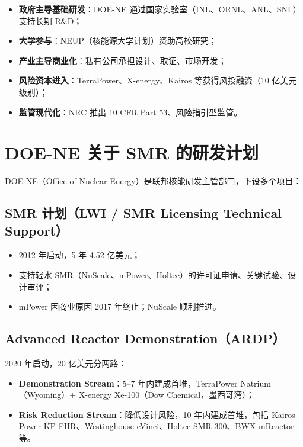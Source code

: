 \documentclass[
  UTF8,
  scheme=plain,
  fontsize=10pt,
  openany
]{ctexbook}
\begin{document}
\begin{itemize}
\tightlist
\item
  \textbf{政府主导基础研发}：DOE-NE
  通过国家实验室（INL、ORNL、ANL、SNL）支持长期 R\&D；
\item
  \textbf{大学参与}：NEUP（核能源大学计划）资助高校研究；
\item
  \textbf{产业主导商业化}：私有公司承担设计、取证、市场开发；
\item
  \textbf{风险资本进入}：TerraPower、X-energy、Kairos 等获得风投融资（10
  亿美元级别）；
\item
  \textbf{监管现代化}：NRC 推出 10 CFR Part 53、风险指引型监管。
\end{itemize}

\section{DOE-NE 关于 SMR
的研发计划}\label{doe-ne-ux5173ux4e8e-smr-ux7684ux7814ux53d1ux8ba1ux5212}

DOE-NE（Office of Nuclear Energy）是联邦核能研发主管部门，下设多个项目：

\subsection{SMR 计划（LWI / SMR Licensing Technical
Support）}\label{smr-ux8ba1ux5212lwi-smr-licensing-technical-support}

\begin{itemize}
\tightlist
\item
  2012 年启动，5 年 4.52 亿美元；
\item
  支持轻水
  SMR（NuScale、mPower、Holtec）的许可证申请、关键试验、设计审评；
\item
  mPower 因商业原因 2017 年终止；NuScale 顺利推进。
\end{itemize}

\subsection{Advanced Reactor
Demonstration（ARDP）}\label{advanced-reactor-demonstrationardp}

2020 年启动，20 亿美元分两路：

\begin{itemize}
\tightlist
\item
  \textbf{Demonstration Stream}：5--7 年内建成首堆，TerraPower
  Natrium（Wyoming）+ X-energy Xe-100（Dow Chemical，墨西哥湾）；
\item
  \textbf{Risk Reduction Stream}：降低设计风险，10 年内建成首堆，包括
  Kairos Power KP-FHR、Westinghouse eVinci、Holtec SMR-300、BWX mReactor
  等。
\end{itemize}
\end{document}
